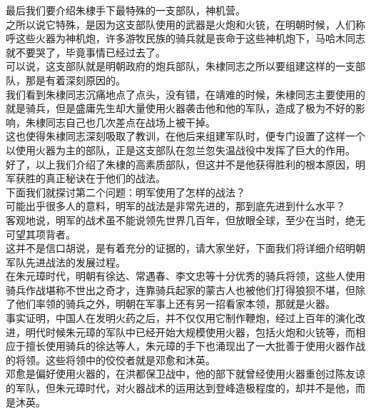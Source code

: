 \begin{multicols}{\theparacolNo}
最后我们要介绍朱棣手下最特殊的一支部队，神机营。\\

之所以说它特殊，是因为这支部队使用的武器是火炮和火铳，在明朝时候，人们称呼这些火器为神机炮，许多游牧民族的骑兵就是丧命于这些神机炮下，马哈木同志就不要哭了，毕竟事情已经过去了。\\

可以说，这支部队就是明朝政府的炮兵部队，朱棣同志之所以要组建这样的一支部队，那是有着深刻原因的。\\

我们看到朱棣同志沉痛地点了点头，没有错，在靖难的时候，朱棣同志主要使用的就是骑兵，但是盛庸先生却大量使用火器袭击他和他的军队，造成了极为不好的影响，朱棣同志自己也几次差点在战场上被干掉。\\

这也使得朱棣同志深刻吸取了教训，在他后来组建军队时，便专门设置了这样一个以使用火器为主的部队，正是这支部队在忽兰忽失温战役中发挥了巨大的作用。\\

好了，以上我们介绍了朱棣的高素质部队，但这并不是他获得胜利的根本原因，明军获胜的真正秘诀在于他们的战法。\\

下面我们就探讨第二个问题：明军使用了怎样的战法？\\

可能出乎很多人的意料，明军的战法是非常先进的，那到底先进到什么水平？\\

客观地说，明军的战术虽不能说领先世界几百年，但放眼全球，至少在当时，绝无可望其项背者。\\

这并不是信口胡说，是有着充分的证据的，请大家坐好，下面我们将详细介绍明朝军队先进战法的发展过程。\\

在朱元璋时代，明朝有徐达、常遇春、李文忠等十分优秀的骑兵将领，这些人使用骑兵作战堪称不世出之奇才，连靠骑兵起家的蒙古人也被他们打得狼狈不堪，但除了他们率领的骑兵之外，明朝在军事上还有另一招看家本领，那就是火器。\\

事实证明，中国人在发明火药之后，并不仅仅用它制作鞭炮，经过上百年的演化改进，明代时候朱元璋的军队中已经开始大规模使用火器，包括火炮和火铳等，而相应于擅长使用骑兵的徐达等人，朱元璋的手下也涌现出了一大批善于使用火器作战的将领。这些将领中的佼佼者就是邓愈和沐英。\\

邓愈是偏好使用火器的，在洪都保卫战中，他的部下就曾经使用火器重创过陈友谅的军队，但朱元璋时代，对火器战术的运用达到登峰造极程度的，却并不是他，而是沐英。\\


\end{multicols}
